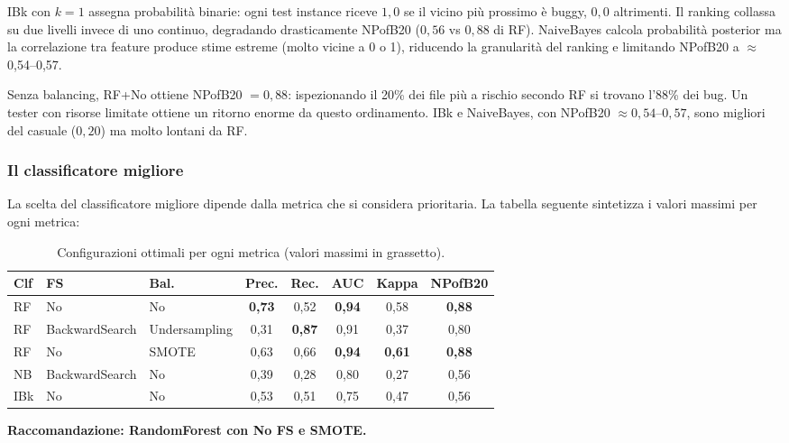 IBk con $k=1$ assegna probabilità binarie: ogni test instance riceve $1{,}0$ se il
vicino più prossimo è buggy, $0{,}0$ altrimenti. Il ranking collassa su due livelli
invece di uno continuo, degradando drasticamente NPofB20 ($0{,}56$ vs $0{,}88$ di RF).
NaiveBayes calcola probabilità posterior ma la correlazione tra feature produce
stime estreme (molto vicine a 0 o 1), riducendo la granularità del ranking e limitando
NPofB20 a $\approx$0,54--0,57.

Senza balancing, RF+No ottiene NPofB20 $= 0{,}88$: ispezionando il 20\% dei file
più a rischio secondo RF si trovano l'88\% dei bug. Un tester con risorse limitate
ottiene un ritorno enorme da questo ordinamento. IBk e NaiveBayes, con NPofB20
$\approx 0{,}54$--$0{,}57$, sono migliori del casuale ($0{,}20$) ma molto lontani
da RF.

\subsubsection{Il classificatore migliore}
\label{sec:best-clf}

La scelta del classificatore migliore dipende dalla metrica che si considera prioritaria.
La tabella seguente sintetizza i valori massimi per ogni metrica:

\begin{table}[h!]
\centering
\small
\begin{tabular}{@{}lllccccc@{}}
\toprule
\textbf{Clf} & \textbf{FS} & \textbf{Bal.} & \textbf{Prec.} & \textbf{Rec.} &
\textbf{AUC} & \textbf{Kappa} & \textbf{NPofB20} \\
\midrule
RF  & No            & No            & \textbf{0,73} & 0,52 & \textbf{0,94} & 0,58 & \textbf{0,88} \\
RF  & BackwardSearch & Undersampling & 0,31          & \textbf{0,87} & 0,91 & 0,37 & 0,80 \\
RF  & No            & SMOTE         & 0,63          & 0,66 & \textbf{0,94} & \textbf{0,61} & \textbf{0,88} \\
NB  & BackwardSearch & No           & 0,39          & 0,28 & 0,80 & 0,27 & 0,56 \\
IBk & No            & No            & 0,53          & 0,51 & 0,75 & 0,47 & 0,56 \\
\bottomrule
\end{tabular}
\caption{Configurazioni ottimali per ogni metrica (valori massimi in grassetto).}
\label{tab:best}
\end{table}

\textbf{Raccomandazione: RandomForest con No FS e SMOTE.}

